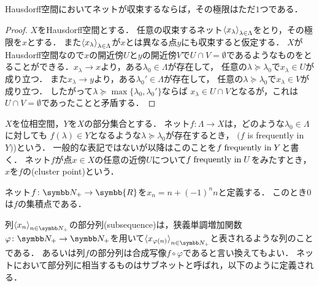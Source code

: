 \documentclass{ltjsbook}
\begin{document}
\begin{thmbox}
\begin{proposition}
Hausdorff空間においてネットが収束するならば，その極限はただ\(1\)つである．
\end{proposition}
\end{thmbox}

\begin{proof} \(X\)をHausdorff空間とする．
任意の収束するネット\({\langle {x}_\lambda \rangle}_{\lambda \in \Lambda}\)をとり，その極限を\(x\)とする．
また\({\langle {x}_\lambda \rangle}_{\lambda \in \Lambda}\)が\(x\)とは異なる点\(y\)にも収束すると仮定する．
\(X\)がHausdorff空間なので\(x\)の開近傍\(U\)と\(y\)の開近傍\(V\)で\(U \cap V = \emptyset\)であるようなものをとることができる．\(x_\lambda \to x\)より，ある\(\lambda_0 \in \Lambda\)が存在して，
任意の\(\lambda \succeq \lambda_0\)で\(x_\lambda \in U\)が成り立つ．
また\(x_\lambda \to y\)より，ある\(\lambda_0' \in \Lambda\)が存在して，
任意の\(\lambda \succeq \lambda_0\)で\(x_\lambda \in V\)が成り立つ．
したがって\(\lambda \succeq \max \{\lambda_0, \lambda_0'\}\)ならば
\(x_\lambda \in U \cap V\)となるが，これは\(U \cap V = \emptyset\)であったことと矛盾する．
\end{proof}

\begin{thmbox}
\begin{definition}
\(X\)を位相空間，\(Y\)を\(X\)の部分集合とする．
ネット\(f \colon \Lambda \to X\)は，どのような\(\lambda_0 \in \Lambda\)に対しても
\(f(\lambda) \in Y\)となるような\(\lambda \succeq \lambda_0\)が存在するとき，
\((f\) is frequently in \(Y)\))という．
一般的な表記ではないが以降はこのことを\(f \mathrel{\text{frequently in}} Y\)と書く．
ネット\(f\)が点\(x \in X\)の任意の近傍\(U\)について\(f \mathrel{\text{frequently in}} U\)をみたすとき，
\(x\)を\(f\)の(cluster point)という．
\end{definition}
\end{thmbox}

\begin{exa}
ネット\(f\colon \PositiveInteger \to \symbb{R}\)を\(x_n = n + (-1)^n n\)と定義する．
このとき\(0\)は\(f\)の集積点である．
\end{exa}


列\(\Sequencen{x}\)の部分列(subsequence)は，狭義単調増加関数\(\varphi\colon\PositiveInteger\to\PositiveInteger\)を用いて\(\Subsequence{x}\)と表されるような列のことである．
あるいは列\(f\)の部分列は合成写像\(f\circ \varphi\)であると言い換えてもよい．
ネットにおいて部分列に相当するものはサブネットと呼ばれ，以下のように定義される．
\end{document}
